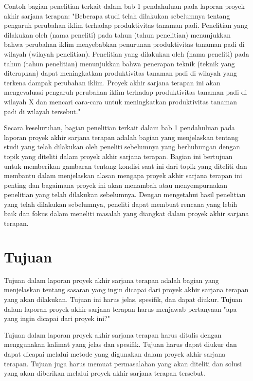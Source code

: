 Contoh bagian penelitian terkait dalam bab 1 pendahuluan pada laporan proyek akhir sarjana terapan:
"Beberapa studi telah dilakukan sebelumnya tentang pengaruh perubahan iklim terhadap produktivitas tanaman padi. Penelitian yang dilakukan oleh (nama peneliti) pada tahun (tahun penelitian) menunjukkan bahwa perubahan iklim menyebabkan penurunan produktivitas tanaman padi di wilayah (wilayah penelitian). Penelitian yang dilakukan oleh (nama peneliti) pada tahun (tahun penelitian) menunjukkan bahwa penerapan teknik (teknik yang diterapkan) dapat meningkatkan produktivitas tanaman padi di wilayah yang terkena dampak perubahan iklim. Proyek akhir sarjana terapan ini akan mengevaluasi pengaruh perubahan iklim terhadap produktivitas tanaman padi di wilayah X dan mencari cara-cara untuk meningkatkan produktivitas tanaman padi di wilayah tersebut."

Secara keseluruhan, bagian penelitian terkait dalam bab 1 pendahuluan pada laporan proyek akhir sarjana terapan adalah bagian yang menjelaskan tentang studi yang telah dilakukan oleh peneliti sebelumnya yang berhubungan dengan topik yang diteliti dalam proyek akhir sarjana terapan. Bagian ini bertujuan untuk memberikan gambaran tentang kondisi saat ini dari topik yang diteliti dan membantu dalam menjelaskan alasan mengapa proyek akhir sarjana terapan ini penting dan bagaimana proyek ini akan menambah atau menyempurnakan penelitian yang telah dilakukan sebelumnya. Dengan mengetahui hasil penelitian yang telah dilakukan sebelumnya, peneliti dapat membuat rencana yang lebih baik dan fokus dalam meneliti masalah yang diangkat dalam proyek akhir sarjana terapan.

\section{Tujuan}
Tujuan dalam laporan proyek akhir sarjana terapan adalah bagian yang menjelaskan tentang sasaran yang ingin dicapai dari proyek akhir sarjana terapan yang akan dilakukan. Tujuan ini harus jelas, spesifik, dan dapat diukur. Tujuan dalam laporan proyek akhir sarjana terapan harus menjawab pertanyaan "apa yang ingin dicapai dari proyek ini?"

Tujuan dalam laporan proyek akhir sarjana terapan harus ditulis dengan menggunakan kalimat yang jelas dan spesifik. Tujuan harus dapat diukur dan dapat dicapai melalui metode yang digunakan dalam proyek akhir sarjana terapan. Tujuan juga harus memuat permasalahan yang akan diteliti dan solusi yang akan diberikan melalui proyek akhir sarjana terapan tersebut.


